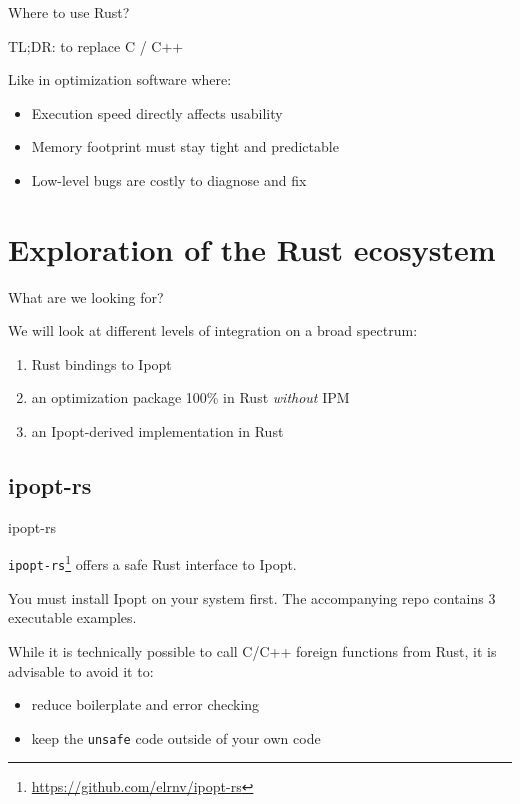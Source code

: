 \documentclass{beamer}
\begin{document}
\begin{frame}{Where to use Rust?}

  \centering
  { \Large TL;DR: to replace C / C++ }

  \vfill

  \flushleft
  Like in optimization software where:

  \begin{itemize}
    \item Execution speed directly affects usability
    \item Memory footprint must stay tight and predictable
    \item Low-level bugs are costly to diagnose and fix
  \end{itemize}

\end{frame}

\section{Exploration of the Rust ecosystem}

\begin{frame}{What are we looking for?}

  We will look at different levels of integration on a broad spectrum:

  \begin{enumerate}
    \item Rust bindings to Ipopt
    \item an optimization package 100\% in Rust \emph{without} IPM
    \item an Ipopt-derived implementation in Rust
  \end{enumerate}

\end{frame}

\subsection{ipopt-rs}

\begin{frame}{ipopt-rs}

  \texttt{ipopt-rs}\footnote{\tiny \url{https://github.com/elrnv/ipopt-rs}} offers a safe Rust interface to Ipopt.

  \vfill

  You must install Ipopt on your system first. The accompanying repo contains 3 executable examples.

  \vfill

  While it is technically possible to call C/C++ foreign functions from Rust,
  it is advisable to avoid it to:

  \begin{itemize}
    \item reduce boilerplate and error checking
    \item keep the \texttt{unsafe} code outside of your own code
  \end{itemize}

\end{frame}
\end{document}
